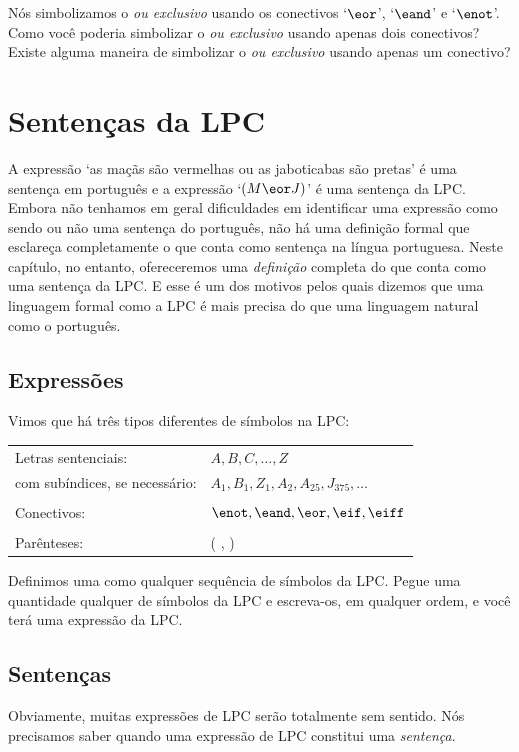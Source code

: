 \problempart
Nós simbolizamos o \emph{ou exclusivo} usando os conectivos `$\eor$', `$\eand$' e `$\enot$'.
Como você poderia simbolizar o \emph{ou exclusivo} usando apenas dois conectivos?
Existe alguma maneira de simbolizar o \emph{ou exclusivo} usando apenas um conectivo?


\chapter{Sentenças da LPC}\label{s:TFLSentences}
A expressão `as maçãs são vermelhas ou as jaboticabas são pretas' é uma sentença em português e a expressão `$(M \eor J)$' é uma sentença da LPC.
Embora não tenhamos em geral dificuldades em identificar uma expressão como sendo ou não uma sentença do português, não há uma definição formal que esclareça completamente o que conta como sentença na língua portuguesa.
Neste capítulo, no entanto, ofereceremos uma \emph{definição} completa do que conta como uma sentença da LPC.
E esse é um dos motivos pelos quais dizemos que uma linguagem formal como a LPC é mais precisa do que uma linguagem natural como o português.


\section{Expressões}

Vimos que há três tipos diferentes de símbolos na LPC:
\begin{center}
\begin{tabular}{l l}
Letras sentenciais: & $A,B,C,\ldots,Z$\\
com subíndices, se necessário: & $A_1, B_1,Z_1,A_2,A_{25},J_{375},\ldots$\\
\\
Conectivos: & $\enot,\eand,\eor,\eif,\eiff$\\
\\
Parênteses: &( , )\\
\end{tabular}
\end{center}
Definimos uma  como qualquer sequência de símbolos da LPC.
Pegue uma quantidade qualquer de símbolos da LPC e escreva-os, em qualquer ordem, e você terá uma expressão da LPC.


\section{Sentenças}\label{s:Sentences}
Obviamente, muitas expressões de LPC serão totalmente sem sentido.
Nós precisamos saber quando uma expressão de LPC constitui uma \emph{sentença}.

